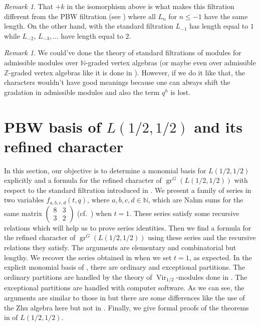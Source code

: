 \documentclass[a4paper, 12pt, reqno]{amsart}
\theoremstyle{remark}
\newtheorem{remark}[theorem]{Remark}
\numberwithin{equation}{subsection}
\DeclareMathOperator{\Vir}{Vir}
\DeclareMathOperator{\gr}{gr}
\begin{document}
\begin{remark}
  \label{rmk:34}
  That $+k$ in the isomorphism above is what makes this filtration different from the PBW filtration (see ) where all $L_n$ for $n \le -1$ have the same length.
  On the other hand, with the standard filtration $L_{-1}$ has length equal to $1$ while $L_{-2}$, $L_{-3}, \dots$ have length equal to $2$.
\end{remark}

\begin{remark}
  \label{rmk:35}
  We could've done the theory of standard filtrations of modules for admissible modules over $\mathbb{N}$-graded vertex algebras (or maybe even over admissible $\mathbb{Z}$-graded vertex algebras like it is done in \cite{li_vertex_2004}).
  However, if we do it like that, the characters wouldn't have good meanings because one can always shift the gradation in admissible modules and also the term $q^h$ is lost.
\end{remark}

\section{PBW basis of $L(1/2, 1/2)$ and its refined character}
\label{sec:pbw-basis-l12}

In this section, our objective is to determine a monomial basis for $L(1/2, 1/2)$ explicitly and a formula for the refined character of $\gr^G(L(1/2, 1/2))$ with respect to the standard filtration introduced in .
We present a family of series in two variables $f_{a, b, c, d}(t, q)$, where $a, b, c, d \in \mathbb{N}$, which are Nahm sums for the same matrix $\left(\begin{smallmatrix} 8 & 3 \\ 3 & 2 \end{smallmatrix}\right)$ (cf.\ \cite{Nahm2007}) when $t = 1$.
These series satisfy some recursive relations which will help us to prove series identities.
Then we find a formula for the refined character of $\gr^G(L(1/2, 1/2))$ using these series and the recursive relations they satisfy.
The arguments are elementary and combinatorial but lengthy.
We recover the series obtained in \cite[Theorem 4]{andrews_singular_2022} when we set $t = 1$, as expected.
In the explicit monomial basis of , there are ordinary and exceptional partitions.
The ordinary partitions are handled by the theory of $\Vir_{1/2}$-modules done in .
The exceptional partitions are handled with computer software.
As we can see, the arguments are similar to those in \cite{andrews_singular_2022} but there are some differences like the use of the Zhu algebra here but not in \cite{andrews_singular_2022}.
Finally, we give formal proofs of the theorems in  of $L(1/2, 1/2)$.
\end{document}

